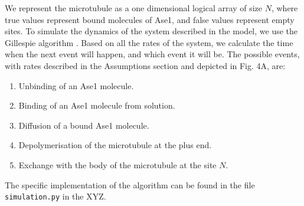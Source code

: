 \documentclass{article}
\begin{document}
We represent the microtubule as a one dimensional logical array of size $N$, where true values represent bound molecules of Ase1, and false values represent empty sites. To simulate the dynamics of the system described in the model, we use the Gillespie algorithm \cite{Gillespie1976}. Based on all the rates of the system, we calculate the time when the next event will happen, and which event it will be. The possible events, with rates described in the Assumptions section and depicted in Fig. 4A, are:
\begin{enumerate}
	\item Unbinding of an Ase1 molecule.
	\item Binding of an Ase1 molecule from solution.
	\item Diffusion of a bound Ase1 molecule.
	\item Depolymerisation of the microtubule at the plus end.
	\item Exchange with the body of the microtubule at the site $N$.
\end{enumerate}
The specific implementation of the algorithm can be found in the file \verb|simulation.py| in the XYZ.

\small


\end{document}
